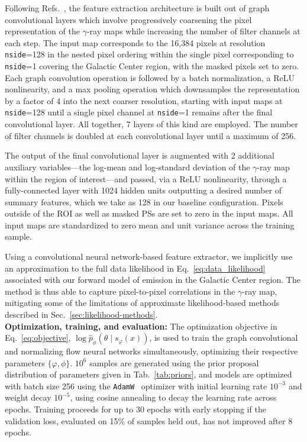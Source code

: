 \documentclass[prd,aps,10pt,nofootinbib,twocolumn,superscriptaddress,preprintnumbers,balancelastpage,longbibliography,floatfix]{revtex4-2}
\begin{document}
Following Refs.~\cite{Perraudin:2018rbt,List:2020mzd}, the feature extraction architecture is built out of graph convolutional layers which involve progressively coarsening the pixel representation of the $\gamma$-ray maps while increasing the number of filter channels at each step. The input map corresponds to the 16,384 pixels at \HEALPix resolution \texttt{nside}=128 in the nested pixel ordering within the single pixel corresponding to \texttt{nside}=1 covering the Galactic Center region, with the masked pixels set to zero. Each graph convolution operation is followed by a batch normalization, a ReLU nonlinearity, and a max pooling operation which downsamples the representation by a factor of 4 into the next coarser \HEALPix resolution, starting with input maps at \texttt{nside}=128 until a single pixel channel at \texttt{nside}=1 remains after the final convolutional layer. All together, 7 layers of this kind are employed. The number of filter channels is doubled at each convolutional layer until a maximum of 256. 

The output of the final convolutional layer is augmented with 2 additional auxiliary variables---the log-mean and log-standard deviation of the $\gamma$-ray map within the region of interest---and passed, via a ReLU nonlinearity, through a fully-connected layer with 1024 hidden units outputting a desired number of summary features, which we take as 128 in our baseline configuration. Pixels outside of the ROI as well as masked PSs are set to zero in the input maps. All input maps are standardized to zero mean and unit variance across the training sample.

Using a convolutional neural network-based feature extractor, we implicitly use an approximation to the full data likelihood in Eq.~\eqref{eq:data_likelihood} associated with our forward model of emission in the Galactic Center region. The method is thus able to capture pixel-to-pixel correlations in the $\gamma$-ray map, mitigating some of the limitations of approximate likelihood-based methods described in Sec.~\ref{sec:likelihood-methods}. \\

\noindent
\textbf{Optimization, training, and evaluation:} The optimization objective in Eq.~\eqref{eq:objective}, $\log \hat{p}_\phi(\theta\mid s_\varphi(x))$, is used to train the graph convolutional and normalizing flow neural networks simultaneously, optimizing their respective parameters $\{\varphi, \phi\}$. $10^{6}$ samples are generated using the prior proposal distribution of parameters given in Tab.~\ref{tab:priors}, and models are optimized with batch size 256 using the \texttt{AdamW}~\cite{DBLP:journals/corr/KingmaB14,DBLP:conf/iclr/LoshchilovH19} optimizer with initial learning rate $10^{-3}$ and weight decay $10^{-5}$, using cosine annealing to decay the learning rate across epochs. Training proceeds for up to 30 epochs with early stopping if the validation loss, evaluated on 15\% of samples held out, has not improved after 8 epochs. 
\end{document}

